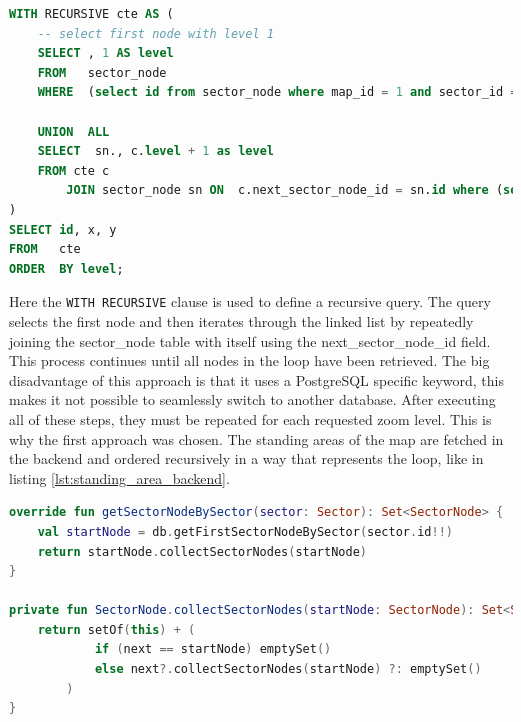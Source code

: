 \begin{lstlisting}[language=SQL, caption=Recursive Query, label=lst:recursive_query]
WITH RECURSIVE cte AS (
    -- select first node with level 1
    SELECT , 1 AS level
    FROM   sector_node
    WHERE  (select id from sector_node where map_id = 1 and sector_id = 1 LIMIT 1) = id

    UNION  ALL
    SELECT  sn., c.level + 1 as level
    FROM cte c
        JOIN sector_node sn ON  c.next_sector_node_id = sn.id where (select id from sector_node where map_id = 1 and sector_id = 1 LIMIT 1) != sn.id
)
SELECT id, x, y
FROM   cte
ORDER  BY level;
\end{lstlisting}

Here the \texttt{WITH RECURSIVE} clause is used to define a recursive query. The query selects the first node and then iterates through the linked list by repeatedly joining the sector\_node table with itself using the next\_sector\_node\_id field. This process continues until all nodes in the loop have been retrieved. The big disadvantage of this approach is that it uses a PostgreSQL specific keyword, this makes it not possible to seamlessly switch to another database. After executing all of these steps, they must be repeated for each requested zoom level. This is why the first approach was chosen. The standing areas of the map are fetched in the backend and ordered recursively in a way that represents the loop, like in listing \ref{lst:standing_area_backend}.

\begin{lstlisting}[language=Kotlin, caption=Standing Area Backend, label=lst:standing_area_backend]
override fun getSectorNodeBySector(sector: Sector): Set<SectorNode> {
    val startNode = db.getFirstSectorNodeBySector(sector.id!!)
    return startNode.collectSectorNodes(startNode)
}

private fun SectorNode.collectSectorNodes(startNode: SectorNode): Set<SectorNode> {
    return setOf(this) + (
            if (next == startNode) emptySet() 
            else next?.collectSectorNodes(startNode) ?: emptySet()
        )
}
\end{lstlisting}